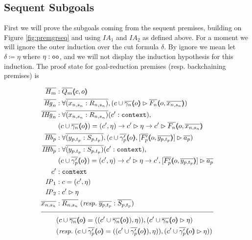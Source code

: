 \subsection{Sequent Subgoals}
\label{subsec:cutpfseqprem}

First we will prove the subgoals coming from the sequent premises, building on Figure \ref{fig:premgrseq} and using $\mathit{IA}_1$ and $\mathit{IA}_2$ as defined above. For a moment we will ignore the outer induction over the cut formula $\delta$. By ignore we mean let $\delta \coloneqq \eta$ where $\eta : \texttt{oo}$, and we will not display the induction hypothesis for this induction. The proof state for goal-reduction premises (resp. backchaining premises) is

\newpage

\begin{align*}
\ol{H_m} &: \ol{Q_m} \args{c , o} \\
\ol{\mathit{Hg}_n} &: \forall \ol{(x_{n,s_n} : R_{n,s_n})}, (\seqsl[c \cup \ol{\gamma_n} \args{o}]{\ol{F_n} \args{o , \ol{x_{n,s_n}}})} \\
\ol{\mathit{IHg}_n} &: \forall \ol{(x_{n,s_n} : R_{n,s_n})} (\inddyncon{} : \sltm{context}), \\
& \; (c \cup \ol{\gamma_n} \args{o}) = (\inddyncon{} , \eta) \rightarrow \seqsl[\inddyncon{}]{\eta} \rightarrow \seqsl[\inddyncon{}]{\ol{F_n} \args{o , \ol{x_{n,s_n}}}} \\
\ol{\mathit{Hb}_p} &: \forall \ol{(y_{p,t_p} : S_{p,t_p})}, (\bchsl[c \cup \ol{\gamma'_p} \args{o}]{\ol{F'_p} \args{o , \ol{y_{p,t_p}}}}{\ol{a_p}}) \\
\ol{\mathit{IHb}_p} &: \forall \ol{(y_{p,t_p} : S_{p,t_p})} (\inddyncon{} : \sltm{context}), \\
& \; (c \cup \ol{\gamma'_p} \args{o}) = (\inddyncon{} , \eta) \rightarrow \seqsl[\inddyncon{}]{\eta} \rightarrow \bchsl[\inddyncon{}]{\ol{F'_p} \args{o , \ol{y_{p,t_p}}}}{\ol{a_p}} \\
\inddyncon{} &: \sltm{context} \\
\mathit{IP}_1 &: c = (\inddyncon{} , \eta) \\
\mathit{IP}_2 &: \seqsl[\inddyncon{}]{\eta} \\
\ol{x_{n,s_n}} &: \ol{R_{n,s_n}} \; (\mathit{resp.} \; \ol{y_{p,t_p}} : \ol{S_{p,t_p}}) \\[\pfshift{}]
\cline{1-2}
& (c \cup \ol{\gamma_n} \args{o} = ((\inddyncon{} \cup \ol{\gamma_n} \args{o}) , \eta)) , (\seqsl[\inddyncon{} \cup \ol{\gamma_n} \args{o}]{\eta}) \\
& (\mathit{resp.} \; (c \cup \ol{\gamma'_p} \args{o} = ((\inddyncon{} \cup \ol{\gamma'_p} \args{o}) , \eta)) , (\seqsl[\inddyncon{} \cup \ol{\gamma'_p} \args{o}]{\eta}))
\end{align*}

